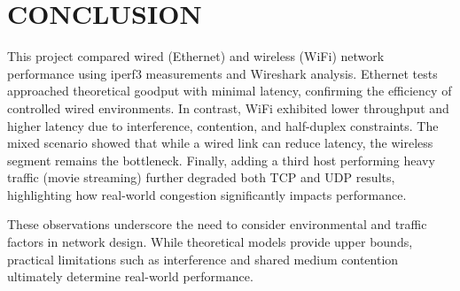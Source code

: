 
\section{CONCLUSION} \label{sec:conclusion}





This project compared wired (Ethernet) and wireless (WiFi) network performance using iperf3 measurements and Wireshark analysis. Ethernet tests approached theoretical goodput with minimal latency, confirming the efficiency of controlled wired environments. In contrast, WiFi exhibited lower throughput and higher latency due to interference, contention, and half-duplex constraints. The mixed scenario showed that while a wired link can reduce latency, the wireless segment remains the bottleneck. Finally, adding a third host performing heavy traffic (movie streaming) further degraded both TCP and UDP results, highlighting how real-world congestion significantly impacts performance.

These observations underscore the need to consider environmental and traffic factors in network design. While theoretical models provide upper bounds, practical limitations such as interference and shared medium contention ultimately determine real-world performance.
